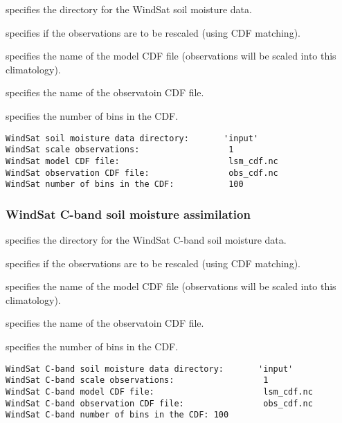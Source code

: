  
  specifies the directory
 for the WindSat soil moisture data.

  specifies if the
 observations are to be rescaled (using CDF matching).

  specifies the
 name of the model CDF file (observations will be scaled into this
 climatology).

  specifies the
 name of the observatoin CDF file.

  specifies the
 number of bins in the CDF.
 

 \begin{Verbatim}[frame=single]
WindSat soil moisture data directory:       'input'
WindSat scale observations:                  1
WindSat model CDF file:                      lsm_cdf.nc
WindSat observation CDF file:                obs_cdf.nc
WindSat number of bins in the CDF:           100
 \end{Verbatim}

 
 
 \subsubsection{WindSat C-band soil moisture assimilation}
 \label{sssec:windsatcbandsmda}
 

 
  specifies the
 directory for the WindSat C-band soil moisture data.

  specifies if the
 observations are to be rescaled (using CDF matching).

  specifies the
 name of the model CDF file (observations will be scaled into this
 climatology).

  specifies the
 name of the observatoin CDF file.

 specifies the number of bins in the CDF.
 

 \begin{Verbatim}[frame=single]
WindSat C-band soil moisture data directory:       'input'
WindSat C-band scale observations:                  1
WindSat C-band model CDF file:                      lsm_cdf.nc
WindSat C-band observation CDF file:                obs_cdf.nc
WindSat C-band number of bins in the CDF: 100 
 \end{Verbatim}
 

